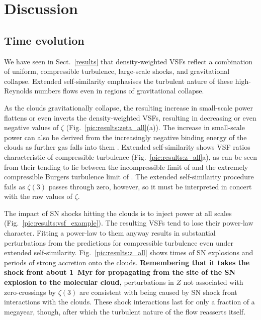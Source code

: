 \section{Discussion}\label{discussion}

\subsection{Time evolution}\label{discussion:normal}

We have seen in Sect.~\ref{results} that density-weighted VSFs reflect a combination of uniform, compressible turbulence, large-scale shocks, and gravitational collapse.  Extended self-similarity emphasises the turbulent nature of these high-Reynolds numbers flows even in regions of gravitational collapse. 

As the clouds gravitationally collapse, the resulting increase in small-scale power flattens or even inverts the density-weighted VSFs, resulting in decreasing or even negative values of $\zeta$ (Fig.~\ref{pic:results:zeta_all}(a)). The increase in small-scale power can also be derived from the increasingly negative binding energy of the clouds as further gas falls into them .  Extended self-similarity shows VSF ratios characteristic of compressible turbulence (Fig.~\ref{pic:results:z_all}a), as can be seen from their tending to lie between the incompressible limit of \citet{She1994} and the extremely compressible Burgers turbulence limit of \citet{Boldyrev2002}.  The extended self-similarity procedure fails as $\zeta(3)$ passes through zero, however, so it must be interpreted in concert with the raw values of $\zeta$.

The impact of SN shocks hitting the clouds is to inject power at all scales (Fig.~\ref{pic:results:vsf_example}). 
The resulting VSFs tend to lose their power-law character. Fitting a power-law to them anyway results in substantial perturbations from the predictions for compressible turbulence even under extended self-similarity.
Fig.~\ref{pic:results:z_all} shows times of SN explosions and periods of strong accretion onto the clouds. 
\textbf{Remembering that it takes the shock front about 1~Myr for propagating from the site of the SN explosion to the molecular cloud,} perturbations in $Z$ not associated with zero-crossings by $\zeta(3)$ are consistent with being caused by SN shock front interactions with the clouds.  
These shock interactions last for only a fraction of a megayear, though, after which the turbulent nature of the flow reasserts itself.



